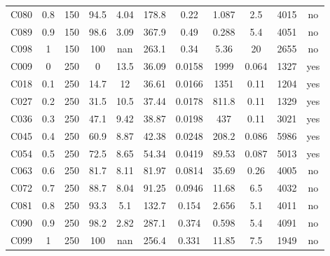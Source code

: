 \begin{longtable}{@{}lcccccccccc@{}}
C080 & 0.8 & 150 & 94.5 & 4.04 & 178.8 & 0.22 & 1.087 & 2.5 & 4015 & no \\
C089 & 0.9 & 150 & 98.6 & 3.09 & 367.9 & 0.49 & 0.288 & 5.4 & 4051 & no \\
C098 & 1 & 150 & 100 & nan & 263.1 & 0.34 & 5.36 & 20 & 2655 & no \\
C009 & 0 & 250 & 0 & 13.5 & 36.09 & 0.0158 & 1999 & 0.064 & 1327 & yes \\
C018 & 0.1 & 250 & 14.7 & 12 & 36.61 & 0.0166 & 1351 & 0.11 & 1204 & yes \\
C027 & 0.2 & 250 & 31.5 & 10.5 & 37.44 & 0.0178 & 811.8 & 0.11 & 1329 & yes \\
C036 & 0.3 & 250 & 47.1 & 9.42 & 38.87 & 0.0198 & 437 & 0.11 & 3021 & yes \\
C045 & 0.4 & 250 & 60.9 & 8.87 & 42.38 & 0.0248 & 208.2 & 0.086 & 5986 & yes \\
C054 & 0.5 & 250 & 72.5 & 8.65 & 54.34 & 0.0419 & 89.53 & 0.087 & 5013 & yes \\
C063 & 0.6 & 250 & 81.7 & 8.11 & 81.97 & 0.0814 & 35.69 & 0.26 & 4005 & no \\
C072 & 0.7 & 250 & 88.7 & 8.04 & 91.25 & 0.0946 & 11.68 & 6.5 & 4032 & no \\
C081 & 0.8 & 250 & 93.3 & 5.1 & 132.7 & 0.154 & 2.656 & 5.1 & 4011 & no \\
C090 & 0.9 & 250 & 98.2 & 2.82 & 287.1 & 0.374 & 0.598 & 5.4 & 4091 & no \\
C099 & 1 & 250 & 100 & nan & 256.4 & 0.331 & 11.85 & 7.5 & 1949 & no \\
\hline
\end{longtable}

